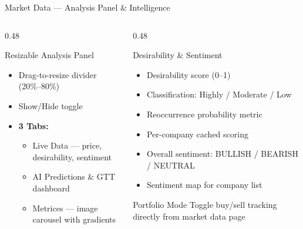 \documentclass[aspectratio=169, 11pt]{beamer}
\begin{document}
\begin{frame}{Market Data — Analysis Panel \& Intelligence}
\begin{columns}[T]
\begin{column}{0.48\textwidth}
\begin{block}{Resizable Analysis Panel}
\begin{itemize}
  \item Drag-to-resize divider (20\%–80\%)
  \item Show/Hide toggle
  \item \textbf{3 Tabs:}
  \begin{itemize}
    \item Live Data — price, desirability, sentiment
    \item AI Predictions \& GTT dashboard
    \item Metrices — image carousel with gradients
  \end{itemize}
\end{itemize}
\end{block}
\end{column}
\begin{column}{0.48\textwidth}
\begin{block}{Desirability \& Sentiment}
\begin{itemize}
  \item Desirability score (0–1)
  \item Classification: Highly / Moderate / Low
  \item Reoccurrence probability metric
  \item Per-company cached scoring
  \item Overall sentiment: BULLISH / BEARISH / NEUTRAL
  \item Sentiment map for company list
\end{itemize}
\end{block}
\vspace{0.3cm}
\begin{alertblock}{Portfolio Mode}
Toggle buy/sell tracking directly from market data page
\end{alertblock}
\end{column}
\end{columns}
\end{frame}

\end{document}
